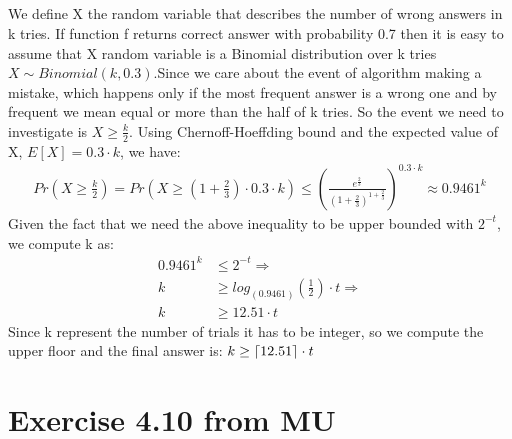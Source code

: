 \documentclass[11pt]{537homework}
\DeclarePairedDelimiter\ceil{\lceil}{\rceil}
\begin{document}
\subsection{}
We define X the random variable that describes the number of wrong answers in k tries. If function f returns correct answer with probability 0.7 then it is easy to assume that X random variable is a Binomial distribution over k tries $X \sim Binomial(k,0.3)$.Since we care about the event of algorithm making a mistake, which happens only if the most frequent answer is a wrong one and by frequent we mean equal or more than the half of k tries. So the event we need to investigate is $X \geq \frac{k}{2}$. Using Chernoff-Hoeffding bound and the expected value of X, $E[X] = 0.3 \cdot k$, we have:
\begin{align*}
Pr(X \geq \frac{k}{2}) = Pr(X \geq (1+\frac{2}{3}) \cdot 0.3\cdot k) \leq (\frac{e^{\frac{2}{3}}}{(1+\frac{2}{3})^{1+\frac{2}{3}}})^{0.3 \cdot k} \approx 0.9461^k  
\end{align*}
Given the fact that we need the above inequality to be upper bounded with $2^{-t}$, we compute k as:
\begin{align*}
 0.9461^k &\leq 2^{-t} \Longrightarrow \\
 k &\geq log_{(0.9461)}(\frac{1}{2}) \cdot t \Longrightarrow \\
 k &\geq 12.51 \cdot t
\end{align*}
Since k represent the number of trials it has to be integer, so we compute the upper floor and the final answer is: $ k \geq \ceil{12.51} \cdot t$
\section{Exercise 4.10 from MU}


\end{document}
